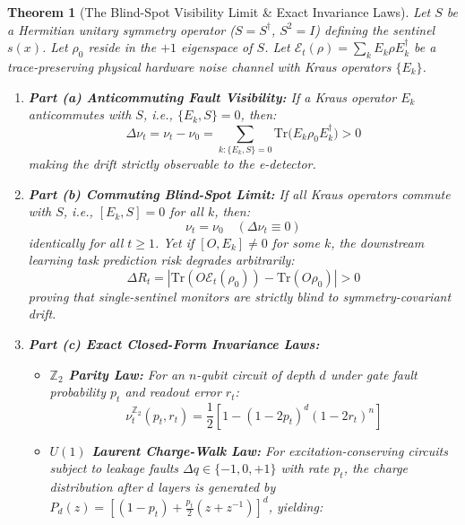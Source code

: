 \documentclass[aps,pra,twocolumn,superscriptaddress,10pt,floatfix]{revtex4-2}
\newtheorem{theorem}{Theorem}
\begin{document}
\begin{theorem}[The Blind-Spot Visibility Limit \& Exact Invariance Laws]
\label{thm:blindspot}
Let $S$ be a Hermitian unitary symmetry operator ($S = S^\dagger$, $S^2 = I$) defining the sentinel $s(x)$. Let $\rho_0$ reside in the $+1$ eigenspace of $S$. Let $\mathcal{E}_t(\rho) = \sum_k E_k \rho E_k^\dagger$ be a trace-preserving physical hardware noise channel with Kraus operators $\{E_k\}$.
\begin{enumerate}
    \item \textbf{Part (a) Anticommuting Fault Visibility:} If a Kraus operator $E_k$ anticommutes with $S$, i.e., $\{E_k, S\} = 0$, then:
    \begin{equation}
    \Delta \nu_t = \nu_t - \nu_0 = \sum_{k: \{E_k, S\} = 0} \mathrm{Tr}\big( E_k \rho_0 E_k^\dagger \big) > 0
    \end{equation}
    making the drift strictly observable to the e-detector.
    \item \textbf{Part (b) Commuting Blind-Spot Limit:} If all Kraus operators commute with $S$, i.e., $[E_k, S] = 0$ for all $k$, then:
    \begin{equation}
    \nu_t = \nu_0 \quad (\Delta \nu_t \equiv 0)
    \end{equation}
    identically for all $t \ge 1$. Yet if $[O, E_k] \ne 0$ for some $k$, the downstream learning task prediction risk degrades arbitrarily:
    \begin{equation}
    \Delta R_t = |\mathrm{Tr}(O \mathcal{E}_t(\rho_0)) - \mathrm{Tr}(O \rho_0)| > 0
    \end{equation}
    proving that single-sentinel monitors are strictly blind to symmetry-covariant drift.
    \item \textbf{Part (c) Exact Closed-Form Invariance Laws:}
    \begin{itemize}
        \item \textbf{$\mathbb{Z}_2$ Parity Law:} For an $n$-qubit circuit of depth $d$ under gate fault probability $p_t$ and readout error $r_t$:
        \begin{equation}
        \nu_t^{\mathbb{Z}_2}(p_t, r_t) = \frac{1}{2} \left[ 1 - (1 - 2p_t)^d (1 - 2r_t)^n \right]
        \label{eq:z2_closed_form}
        \end{equation}
        \item \textbf{$U(1)$ Laurent Charge-Walk Law:} For excitation-conserving circuits subject to leakage faults $\Delta q \in \{-1, 0, +1\}$ with rate $p_t$, the charge distribution after $d$ layers is generated by $P_d(z) = [(1 - p_t) + \frac{p_t}{2}(z + z^{-1})]^d$, yielding:

\end{itemize}
\end{enumerate}
\end{theorem}
\end{document}
